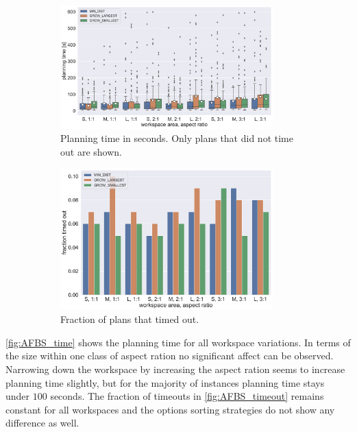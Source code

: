 \begin{figure}
	\centering
	\begin{subfigure}[b]{\textwidth}
		\centering
		\includegraphics[width=0.9\textwidth]{figures/plots/AFBS_time.pdf}
		\caption{Planning time in seconds. Only plans that did not time out are shown.}
		\label{fig:AFBS_time}
	\end{subfigure}
	
	\begin{subfigure}[b]{\textwidth}
		\centering
		\includegraphics[width=0.9\textwidth]{figures/plots/AFBS_timeout.pdf}
		\caption{Fraction of plans that timed out.}
		\label{fig:AFBS_timeout}
	\end{subfigure}
	\caption[]{}
	\label{fig:AFBS_timestats}
\end{figure}

\autoref{fig:AFBS_time} shows the planning time for all workspace variations.
In terms of the size within one class of aspect ration no significant affect can be observed.
Narrowing down the workspace by increasing the aspect ration seems to increase planning time slightly, but for the majority of instances planning time stays under $100$ seconds.
The fraction of timeouts in \autoref{fig:AFBS_timeout} remains constant for all workspaces and the options sorting strategies do not show any difference as well.

